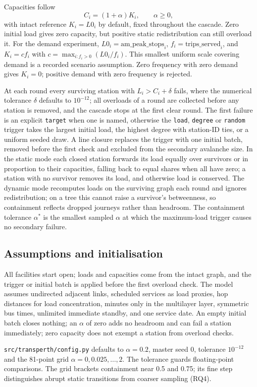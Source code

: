 Capacities follow
\begin{equation}
  C_i = (1+\alpha) K_i, \qquad \alpha \ge 0,
  \label{eq:capacity}
\end{equation}
with intact reference $K_i = L0_i$ by default, fixed throughout the cascade.
Zero initial load gives zero capacity, but positive static redistribution can
still overload it. For the demand experiment, $L0_i = \text{am\_peak\_stops}_i$,
$f_i = \text{trips\_served}_i$, and $K_i = c f_i$ with
$c = \max_{i:f_i>0}(L0_i/f_i)$. This smallest uniform scale covering demand is
a recorded scenario assumption. Zero frequency with zero demand gives $K_i=0$;
positive demand with zero frequency is rejected.

At each round every surviving station with $L_i > C_i + \delta$ fails, where
the numerical tolerance $\delta$ defaults to $10^{-12}$; all overloads of a
round are collected before any station is removed, and the cascade stops at the
first clear round. The first failure is an explicit \texttt{target} when one is
named, otherwise the \texttt{load}, \texttt{degree} or \texttt{random} trigger
takes the largest initial load, the highest degree with station-ID ties, or a
uniform seeded draw. A line closure replaces the trigger with one initial
batch, removed before the first check and excluded from the secondary avalanche
size. In the static mode each closed station forwards its load equally over
survivors or in proportion to their capacities, falling back to equal shares
when all have zero; a station with no survivor removes its load, and otherwise
load is conserved. The dynamic mode recomputes loads on
the surviving graph each round and ignores redistribution; on a tree this
cannot raise a survivor's betweenness, so containment reflects dropped journeys
rather than headroom. The containment tolerance $\alpha^*$ is the smallest
sampled $\alpha$ at which the maximum-load trigger causes no secondary failure.

\subsection{Assumptions and initialisation}
All facilities start open; loads and capacities come from the intact graph, and
the trigger or initial batch is applied before the first overload check. The
model assumes undirected adjacent links, scheduled services as load proxies,
hop distances for load concentration, minutes only in the multilayer layer,
symmetric bus times, unlimited immediate standby, and one service date. An
empty initial batch closes nothing; an
$\alpha$ of zero adds no headroom and can fail a station immediately; zero
capacity does not exempt a station from overload checks.

\texttt{src/transperth/config.py} defaults to $\alpha=0.2$, master seed 0,
tolerance $10^{-12}$ and the 81-point grid $\alpha=0,0.025,\ldots,2$.
The tolerance guards floating-point comparisons. The grid brackets containment
near 0.5 and 0.75; its fine step distinguishes abrupt static transitions from
coarser sampling (RQ4).
